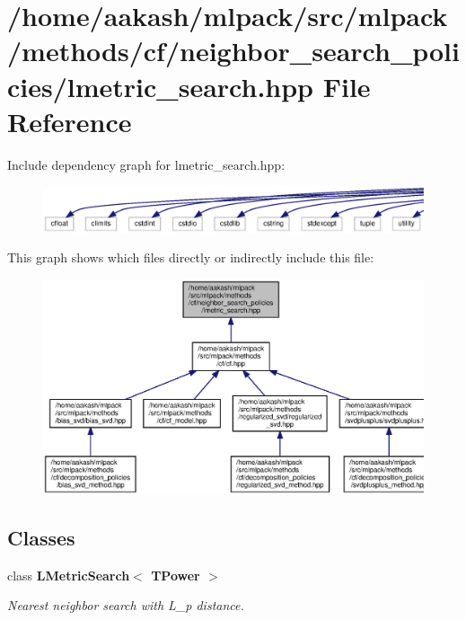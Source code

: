 \section{/home/aakash/mlpack/src/mlpack/methods/cf/neighbor\+\_\+search\+\_\+policies/lmetric\+\_\+search.hpp File Reference}
\label{lmetric__search_8hpp}
Include dependency graph for lmetric\+\_\+search.\+hpp\+:
\nopagebreak
\begin{figure}[H]
\begin{center}
\leavevmode
\includegraphics[width=350pt]{lmetric__search_8hpp__incl}
\end{center}
\end{figure}
This graph shows which files directly or indirectly include this file\+:
\nopagebreak
\begin{figure}[H]
\begin{center}
\leavevmode
\includegraphics[width=350pt]{lmetric__search_8hpp__dep__incl}
\end{center}
\end{figure}
\subsection*{Classes}
\begin{DoxyCompactItemize}
\item 
class \textbf{ L\+Metric\+Search$<$ T\+Power $>$}
\begin{DoxyCompactList}\small\item\em Nearest neighbor search with L\+\_\+p distance. \end{DoxyCompactList}\end{DoxyCompactItemize}
